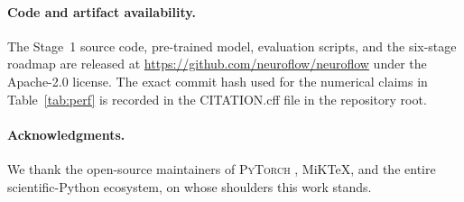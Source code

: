 \documentclass[10pt,twocolumn]{article}
\renewcommand{\texttt}[1]{{\normalfont\ttfamily #1}\normalfont\rmfamily}
\newcommand{\py}{\textsc{PyTorch}}
\begin{document}
\paragraph{Code and artifact availability.}
The Stage~1 source code, pre-trained model, evaluation
scripts, and the six-stage roadmap are released at
\url{https://github.com/neuroflow/neuroflow} under the
Apache-2.0 license.  The exact commit hash used for the
numerical claims in Table~\ref{tab:perf} is recorded in the
\texttt{CITATION.cff} file in the repository root.

\paragraph{Acknowledgments.}
We thank the open-source maintainers of \py{} ,
MiKTeX, and the entire scientific-Python ecosystem, on whose
shoulders this work stands.
\end{document}
